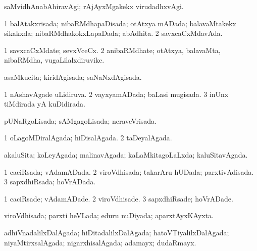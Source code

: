 \bentry
{} 
\gl{\kirxvi}
\expl{}
\bmng
 saMvidhAnabAhiravAgi; rAjAyxMgakekx virudadhxvAgi. 
\emng
\eentry

\bentry
{} 
\gl{\gu}
\expl{}
\bmng
\bnum
\num{1} balAtakxrisada; nibaRMdhapaDisada; otAtxya mADada; balavaMtakekx sikakxda; nibaRMdhakokxLapaDada; abAdhita. 
\num{2} savxcaCxMdavAda. 
\enum
\emng
\eentry

\bentry
{} 
\gl{\nA}
\expl{}
\bmng
\bnum
\num{1} savxcaCxMdate; sevxVceCx. 
\num{2} anibaRMdhate; otAtxya, balavaMta, nibaRMdha, \mo vugaLilalxdiruvike. 
\enum
\emng
\eentry

\bentry
{} 
\gl{\gu}
\expl{}
\bmng
 asaMkucita; kiridAgisada; saNaNxdAgisada. 
\emng
\eentry

\bentry
{} 
\gl{\gu}
\expl{}
\bmng
\bnum
\num{1} nAshavAgade uLidiruva. 
\num{2} vayxyamADada; baLasi mugisada. 
\num{3} inUnx tiMdirada yA kuDidirada. 
\enum
\emng
\eentry

\bentry
{} 
\gl{\gu}
\expl{}
\bmng
 pUNaRgoLisada; sAMgagoLisada; neraveVrisada. 
\emng
\eentry

\bentry
{} 
\gl{\gu}
\expl{}
\bmng
\bnum
\num{1} oLagoMDiralAgada; hiDisalAgada. 
\num{2} taDeyalAgada. 
\enum
\emng
\eentry

\bentry
{} 
\gl{\gu}
\expl{}
\bmng
 akaluSita; koLeyAgada; malinavAgada; kaLaMkitagoLaLxda; kaluSitavAgada. 
\emng
\eentry

\bentry
{} 
\gl{\gu}
\expl{}
\bmng
\bnum
\num{1} caciRsada; vAdamADada. 
\num{2} viroVdhisada; takarAru hUDada; parxtivAdisada. 
\num{3} sapxdhiRsada; hoVrADada. 
\enum
\emng
\eentry

\bentry
{} 
\gl{\kirxvi}
\expl{}
\bmng
\bnum
\num{1} caciRsade; vAdamADade. 
\num{2} viroVdhisade. 
\num{3} sapxdhiRsade; hoVrADade. 
\enum
\emng
\eentry

\bentry
{} 
\gl{\gu}
\expl{}
\bmng
 viroVdhisada; parxti heVLada; eduru nuDiyada; aparxtAyxKAyxta. 
\emng
\eentry

\bentry
{} 
\gl{\gu}
\expl{}
\bmng
 adhiVnadalilxDalAgada; hiDitadalilxDalAgada; hatoVTiyalilxDalAgada; niyaMtirxsalAgada; nigarxhisalAgada; adamayx; dudaRmayx. 
\emng
\eentry

